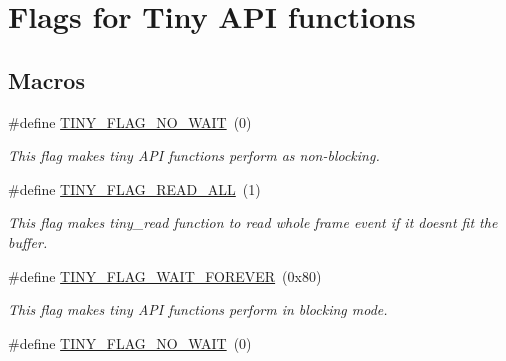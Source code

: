 \hypertarget{group__FLAGS__GROUP}{}\section{Flags for Tiny A\+P\+I functions}
\label{group__FLAGS__GROUP}
\subsection*{Macros}
\begin{DoxyCompactItemize}
\item 
\hypertarget{group__FLAGS__GROUP_gadadd60eb21d7949e6d097ad36aab9b2e}{}\#define \hyperlink{group__FLAGS__GROUP_gadadd60eb21d7949e6d097ad36aab9b2e}{T\+I\+N\+Y\+\_\+\+F\+L\+A\+G\+\_\+\+N\+O\+\_\+\+W\+A\+I\+T}~(0)\label{group__FLAGS__GROUP_gadadd60eb21d7949e6d097ad36aab9b2e}

\begin{DoxyCompactList}\small\item\em This flag makes tiny A\+P\+I functions perform as non-\/blocking. \end{DoxyCompactList}\item 
\hypertarget{group__FLAGS__GROUP_gae41123cfeed375e618a4152c9bbd0d6d}{}\#define \hyperlink{group__FLAGS__GROUP_gae41123cfeed375e618a4152c9bbd0d6d}{T\+I\+N\+Y\+\_\+\+F\+L\+A\+G\+\_\+\+R\+E\+A\+D\+\_\+\+A\+L\+L}~(1)\label{group__FLAGS__GROUP_gae41123cfeed375e618a4152c9bbd0d6d}

\begin{DoxyCompactList}\small\item\em This flag makes tiny\+\_\+read function to read whole frame event if it doesn\textquotesingle{}t fit the buffer. \end{DoxyCompactList}\item 
\hypertarget{group__FLAGS__GROUP_ga3a34267804581c5709d03f52d232b307}{}\#define \hyperlink{group__FLAGS__GROUP_ga3a34267804581c5709d03f52d232b307}{T\+I\+N\+Y\+\_\+\+F\+L\+A\+G\+\_\+\+W\+A\+I\+T\+\_\+\+F\+O\+R\+E\+V\+E\+R}~(0x80)\label{group__FLAGS__GROUP_ga3a34267804581c5709d03f52d232b307}

\begin{DoxyCompactList}\small\item\em This flag makes tiny A\+P\+I functions perform in blocking mode. \end{DoxyCompactList}\item 
\hypertarget{group__FLAGS__GROUP_gadadd60eb21d7949e6d097ad36aab9b2e}{}\#define \hyperlink{group__FLAGS__GROUP_gadadd60eb21d7949e6d097ad36aab9b2e}{T\+I\+N\+Y\+\_\+\+F\+L\+A\+G\+\_\+\+N\+O\+\_\+\+W\+A\+I\+T}~(0)\label{group__FLAGS__GROUP_gadadd60eb21d7949e6d097ad36aab9b2e}


\end{DoxyCompactItemize}
